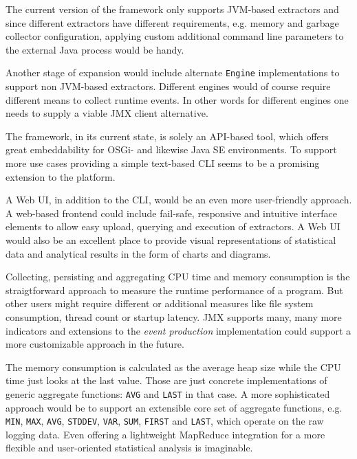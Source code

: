 The current version of the framework only supports \gls{JVM}-based extractors and since different extractors have different requirements, e.g. memory and garbage collector configuration, applying custom additional command line parameters to the external Java process would be handy.

Another stage of expansion would include alternate \texttt{Engine} implementations to support non \gls{JVM}-based extractors. Different engines would of course require different means to collect runtime events. In other words for different engines one needs to supply a viable \gls{JMX} client alternative.

The framework, in its current state, is solely an \gls{API}-based tool, which offers great embeddability for \gls{OSGi}- and likewise Java SE environments. To support more use cases providing a simple text-based \gls{CLI} seems to be a promising extension to the platform.

A Web \gls{UI}, in addition to the \gls{CLI}, would be an even more user-friendly approach. A web-based frontend could include fail-safe, responsive and intuitive interface elements to allow easy upload, querying and execution of extractors. A Web \gls{UI} would also be an excellent place to provide visual representations of statistical data and analytical results in the form of charts and diagrams.

Collecting, persisting and aggregating CPU time and memory consumption is the straigtforward approach to measure the runtime performance of a program. But other users might require different or additional measures like file system consumption, thread count or startup latency. \gls{JMX} supports many, many more indicators and extensions to the \textit{event production} implementation could support a more customizable approach in the future.

The memory consumption is calculated as the average heap size while the CPU time just looks at the last value. Those are just concrete implementations of generic aggregate functions: \texttt{AVG} and \texttt{LAST} in that case. A more sophisticated approach would be to support an extensible core set of aggregate functions, e.g. \texttt{MIN}, \texttt{MAX}, \texttt{AVG}, \texttt{STDDEV}, \texttt{VAR}, \texttt{SUM}, \texttt{FIRST} and \texttt{LAST}, which operate on the raw logging data. Even offering a lightweight MapReduce integration for a more flexible and user-oriented statistical analysis is imaginable.